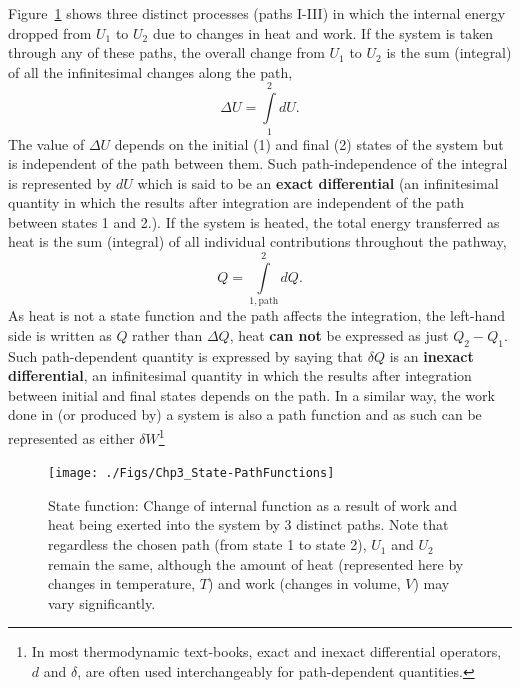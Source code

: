         Figure~\ref{Chapter:FirstLaw:Fig:StateFunctions} shows three distinct processes (paths I-III) in which the internal energy dropped from $U_{1}$ to $U_{2}$ due to changes in heat and work. If the system is taken through any of these paths, the overall change from $U_{1}$ to $U_{2}$ is the sum (\ie integral) of all the infinitesimal changes along the path,
        \begin{displaymath}
             \Delta U = \int\limits_{1}^{2} dU.
        \end{displaymath}
        The value of $\Delta U$ depends on the initial (1) and final (2) states of the system but is independent of the path between them. Such path-independence of the integral is represented by $dU$ which is said to be an {\bf exact differential} (\ie an infinitesimal quantity in which the results after integration are independent of the path between states 1 and 2.). If the system is heated, the total energy transferred as heat is the sum (\ie integral) of all individual contributions throughout the pathway,
        \begin{displaymath}
             Q = \int\limits_{1,\text{path}}^{2}dQ.
        \end{displaymath}
        As heat is not a state function and the path affects the integration, the left-hand side is written as $Q$ rather than $\Delta Q$, \ie heat {\bf can not} be expressed as just $Q_{2}-Q_{1}$. Such path-dependent quantity is expressed by saying that $\delta Q$ is an {\bf inexact differential}, \ie an infinitesimal quantity in which the results after integration between initial and final states depends on the path.  In a similar way, the work done in  (or produced by) a system is also a path function and as such can be represented as either $\delta W$\footnote{In most thermodynamic text-books, exact and inexact differential operators, $d$ and $\delta$, are often used interchangeably for path-dependent quantities.}


   \begin{figure}[h]
     \begin{center}
       \texttt{[image: ./Figs/Chp3\_State-PathFunctions]}
        \caption{State function: Change of internal function as a result of work and heat being exerted into the system by 3 distinct paths. Note that regardless the chosen path (from state 1 to state 2), $U_{1}$ and $U_{2}$ remain the same, although the amount of heat (represented here by changes in temperature, $T$) and work (\ie changes in volume, $V$) may vary significantly.}\label{Chapter:FirstLaw:Fig:StateFunctions}
     \end{center}
   \end{figure}


